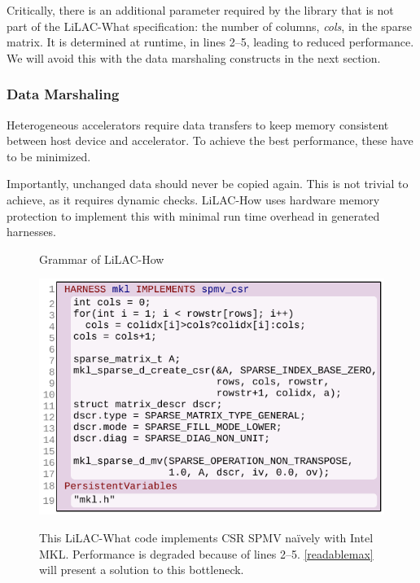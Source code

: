 Critically, there is an additional parameter required by the library that is
not part of the LiLAC-What specification: the number of columns, {\em cols}, in
the sparse matrix.
It is determined at runtime, in lines 2--5, leading to reduced performance.
We will avoid this with the data marshaling constructs in the next section.

\subsubsection{Data Marshaling}
Heterogeneous accelerators require data transfers to keep memory consistent
between host device and accelerator.
To achieve the best performance, these have to be minimized.

Importantly, unchanged data should never be copied again.
This is not trivial to achieve, as it requires dynamic checks.
LiLAC-How uses hardware memory protection to implement this with minimal
run time overhead in generated harnesses.

\begin{figure}[t]
\centering

\vspace{-1.5em}
\caption{Grammar of LiLAC-How}
\label{lilacbnf2}
\vspace{0.8em}
\includegraphics[width=0.944\linewidth]{figures/harness2.pdf}
\\[-0.75em]
\caption{This LiLAC-What code implements CSR SPMV na\"ively with Intel MKL.
         Performance is degraded because of lines 2--5.
         \autoref{readablemax} will present a solution to this bottleneck.}
\vspace{2.em}
\label{mklharness1}
\end{figure}


